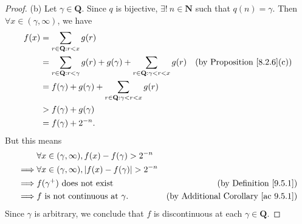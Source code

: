 \begin{proof}{(b)}
    Let \(\gamma \in \mathbf{Q}\).
    Since \(q\) is bijective, \(\exists!\ n \in \mathbf{N}\) such that \(q(n) = \gamma\).
    Then \(\forall x \in (\gamma, \infty)\), we have
    \begin{align*}
        f(x) & = \sum_{r \in \mathbf{Q} : r < x} g(r)                                                                                                           \\
             & = \sum_{r \in \mathbf{Q} : r < \gamma} g(r) + g(\gamma) + \sum_{r \in \mathbf{Q} : \gamma < r < x} g(r) & \text{(by Proposition \ref{8.2.6}(c))} \\
             & = f(\gamma) + g(\gamma) + \sum_{r \in \mathbf{Q} : \gamma < r < x} g(r)                                                                          \\
             & > f(\gamma) + g(\gamma)                                                                                                                          \\
             & = f(\gamma) + 2^{-n}.
    \end{align*}
    But this means
    \begin{align*}
                 & \forall x \in (\gamma, \infty), f(x) - f(\gamma) > 2^{-n}                                                          \\
        \implies & \forall x \in (\gamma, \infty), \abs*{f(x) - f(\gamma)} > 2^{-n}                                                   \\
        \implies & f(\gamma^+) \text{ does not exist}                               & \text{(by Definition \ref{9.5.1})}              \\
        \implies & f \text{ is not continuous at } \gamma.                          & \text{(by Additional Corollary \ref{ac 9.5.1})}
    \end{align*}
    Since \(\gamma\) is arbitrary, we conclude that \(f\) is discontinuous at each \(\gamma \in \mathbf{Q}\).
\end{proof}

